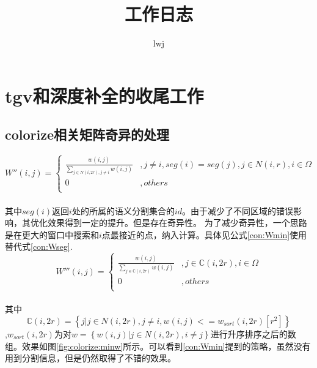 \documentclass[UTF8]{ctexart}
\title{工作日志}
\author{lwj}
\begin{document}
    \begin{sloppypar}
        \maketitle
        \newpage
        \tableofcontents
        \newpage
        \section{tgv和深度补全的收尾工作}
        \subsection{colorize相关矩阵奇异的处理}
        \begin{equation}
            W''(i,j) = \left\{
            \begin{array}{cc}
                \frac{w(i,j)}{\sum\limits_{j\in N(i,2r),j\neq i }w(i,j)}&,j \neq i,seg(i)=seg(j),j \in N(i,r), i\in \Omega  \\
                0&, others\\
            \end{array} \right.
            \label{con:Wseg}
        \end{equation}\\
        其中$seg(i)$返回$i$处的所属的语义分割集合的$id$。由于减少了不同区域的错误影响，其优化效果得到一定的提升。但是存在奇异性。
        为了减少奇异性，一个思路是在更大的窗口中搜索和$i$点最接近的点，纳入计算。具体见公式\eqref{con:Wmin}使用替代式\eqref{con:Wseg}.
        \begin{equation}
            W'''(i,j) = \left\{
            \begin{array}{cc}
                \frac{w(i,j)}{\sum\limits_{j\in \mathbb{C}(i,2r) }w(i,j)}&,j \in \mathbb{C}(i,2r), i\in \Omega  \\
                0&, others\\
            \end{array} \right.
            \label{con:Wmin}
        \end{equation}\\
        其中$$\mathbb{C}(i,2r)= \left\{  j|j\in N(i,2r),j \neq i, w(i,j)<=w_{sort}(i,2r)[r^2] \right\}$$,$w_{sort}(i,2r)$为对$w=\left\{w(i,j)|j\in N(i,2r),i\neq j  \right\}$进行升序排序之后的数组。效果如图\ref{fig:colorize:minw}所示。可以看到\eqref{con:Wmin}提到的策略，虽然没有用到分割信息，但是仍然取得了不错的效果。
        \begin{figure}[htbp]
            \begin{minipage}[t]{0.3\linewidth}

\end{minipage}
\end{figure}
\end{sloppypar}
\end{document}
